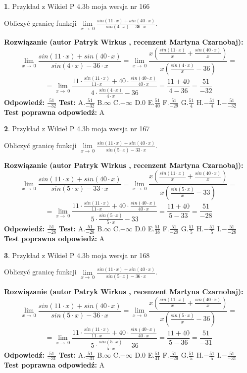 \documentclass[12pt, a4paper]{article}
\theoremstyle{definition} %
\newtheorem{zad}{}
\newcommand{\zadStart}[1]{\begin{zad}#1\newline}
\newcommand{\zadStop}{\end{zad}}
\newcommand{\rozwStart}[2]{\noindent \textbf{Rozwiązanie (autor #1 , recenzent #2): }\newline}
\newcommand{\rozwStop}{\newline}
\newcommand{\odpStart}{\noindent \textbf{Odpowiedź:}\newline}
\newcommand{\odpStop}{\newline}
\newcommand{\testStart}{\noindent \textbf{Test:}\newline}
\newcommand{\testStop}{\newline}
\newcommand{\kluczStart}{\noindent \textbf{Test poprawna odpowiedź:}\newline}
\newcommand{\kluczStop}{\newline}
\begin{document}
\zadStart{Przykład z Wikieł P 4.3b moja wersja nr 166}


Obliczyć granicę funkcji $\lim\limits_{x\to\ 0}\frac{sin(11 \cdot x)+sin(40 \cdot x)}{sin(4 \cdot x)-36 \cdot x}$.
\zadStop
\rozwStart{Patryk Wirkus}{Martyna Czarnobaj}
$$\lim\limits_{x\to\ 0}\frac{sin(11 \cdot x)+sin(40 \cdot x)}{sin(4 \cdot x)-36 \cdot x}=\lim\limits_{x\to\ 0}\frac{x(\frac{sin(11 \cdot x)}{x}+\frac{sin(40 \cdot x)}{x})}{x(\frac{sin(4 \cdot x)}{x}-36)}=$$
$$=\lim\limits_{x\to\ 0}\frac{11 \cdot \frac{sin(11 \cdot x)}{11 \cdot x}+40 \cdot \frac{sin(40 \cdot x)}{40 \cdot x}}{4 \cdot \frac{sin(4 \cdot x)}{4 \cdot x}-36}=\frac{11+40}{4-36} = \frac{51}{-32}$$
\rozwStop
\odpStart
$\frac{51}{-32}$
\odpStop
\testStart
A.$\frac{51}{-32}$
B.$\infty$
C.$-\infty$
D.$0$
E.$\frac{51}{40}$
F.$\frac{51}{-29}$
G.$\frac{51}{4}$
H.$-\frac{51}{4}$
I.$-\frac{51}{-32}$
\testStop
\kluczStart
A
\kluczStop



\zadStart{Przykład z Wikieł P 4.3b moja wersja nr 167}


Obliczyć granicę funkcji $\lim\limits_{x\to\ 0}\frac{sin(11 \cdot x)+sin(40 \cdot x)}{sin(5 \cdot x)-33 \cdot x}$.
\zadStop
\rozwStart{Patryk Wirkus}{Martyna Czarnobaj}
$$\lim\limits_{x\to\ 0}\frac{sin(11 \cdot x)+sin(40 \cdot x)}{sin(5 \cdot x)-33 \cdot x}=\lim\limits_{x\to\ 0}\frac{x(\frac{sin(11 \cdot x)}{x}+\frac{sin(40 \cdot x)}{x})}{x(\frac{sin(5 \cdot x)}{x}-33)}=$$
$$=\lim\limits_{x\to\ 0}\frac{11 \cdot \frac{sin(11 \cdot x)}{11 \cdot x}+40 \cdot \frac{sin(40 \cdot x)}{40 \cdot x}}{5 \cdot \frac{sin(5 \cdot x)}{5 \cdot x}-33}=\frac{11+40}{5-33} = \frac{51}{-28}$$
\rozwStop
\odpStart
$\frac{51}{-28}$
\odpStop
\testStart
A.$\frac{51}{-28}$
B.$\infty$
C.$-\infty$
D.$0$
E.$\frac{51}{38}$
F.$\frac{51}{-29}$
G.$\frac{51}{5}$
H.$-\frac{51}{5}$
I.$-\frac{51}{-28}$
\testStop
\kluczStart
A
\kluczStop



\zadStart{Przykład z Wikieł P 4.3b moja wersja nr 168}


Obliczyć granicę funkcji $\lim\limits_{x\to\ 0}\frac{sin(11 \cdot x)+sin(40 \cdot x)}{sin(5 \cdot x)-36 \cdot x}$.
\zadStop
\rozwStart{Patryk Wirkus}{Martyna Czarnobaj}
$$\lim\limits_{x\to\ 0}\frac{sin(11 \cdot x)+sin(40 \cdot x)}{sin(5 \cdot x)-36 \cdot x}=\lim\limits_{x\to\ 0}\frac{x(\frac{sin(11 \cdot x)}{x}+\frac{sin(40 \cdot x)}{x})}{x(\frac{sin(5 \cdot x)}{x}-36)}=$$
$$=\lim\limits_{x\to\ 0}\frac{11 \cdot \frac{sin(11 \cdot x)}{11 \cdot x}+40 \cdot \frac{sin(40 \cdot x)}{40 \cdot x}}{5 \cdot \frac{sin(5 \cdot x)}{5 \cdot x}-36}=\frac{11+40}{5-36} = \frac{51}{-31}$$
\rozwStop
\odpStart
$\frac{51}{-31}$
\odpStop
\testStart
A.$\frac{51}{-31}$
B.$\infty$
C.$-\infty$
D.$0$
E.$\frac{51}{41}$
F.$\frac{51}{-29}$
G.$\frac{51}{5}$
H.$-\frac{51}{5}$
I.$-\frac{51}{-31}$
\testStop
\kluczStart
A
\kluczStop
\end{document}
